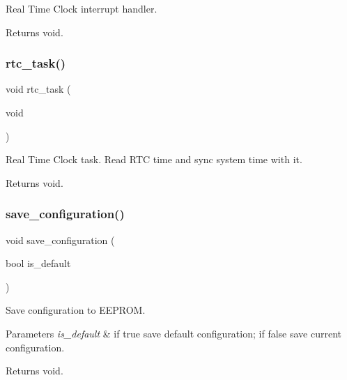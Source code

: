 Real Time Clock interrupt handler. 

\begin{DoxyReturn}{Returns}
void. 
\end{DoxyReturn}
\mbox{\label{rmap_8ino_a52f7fb7ebbd710f2a06b3f6e47c7e7e3}} 
\subsubsection{\texorpdfstring{rtc\+\_\+task()}{rtc\_task()}}
{\footnotesize\ttfamily void rtc\+\_\+task (\begin{DoxyParamCaption}\item[{void}]{ }\end{DoxyParamCaption})}



Real Time Clock task. Read R\+TC time and sync system time with it. 

\begin{DoxyReturn}{Returns}
void. 
\end{DoxyReturn}
\mbox{\label{rmap_8ino_afa979a8cb238fe81bf20654dfd6096ef}} 
\subsubsection{\texorpdfstring{save\+\_\+configuration()}{save\_configuration()}}
{\footnotesize\ttfamily void save\+\_\+configuration (\begin{DoxyParamCaption}\item[{bool}]{is\+\_\+default }\end{DoxyParamCaption})}



Save configuration to E\+E\+P\+R\+OM. 


\begin{DoxyParams}{Parameters}
{\em is\+\_\+default} & if true save default configuration; if false save current configuration. \\
\hline
\end{DoxyParams}
\begin{DoxyReturn}{Returns}
void. 
\end{DoxyReturn}
\mbox{\label{rmap_8ino_ad3efe51e17cb8205a24267c2992a12d4}} 
